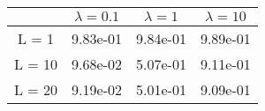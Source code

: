 \begin{tabular}{cccc}
& $\lambda = 0.1$ & $\lambda = 1$ & $\lambda = 10$ \\
\hline
L = 1 & 9.83e-01 & 9.84e-01 & 9.89e-01 \\
L = 10 & 9.68e-02 & 5.07e-01 & 9.11e-01 \\
L = 20 & 9.19e-02 & 5.01e-01 & 9.09e-01 \\
\hline
\end{tabular}
